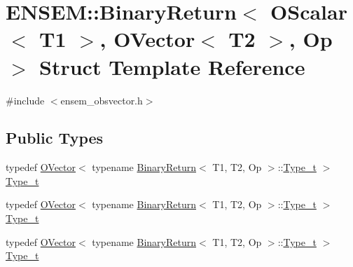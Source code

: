 \hypertarget{structENSEM_1_1BinaryReturn_3_01OScalar_3_01T1_01_4_00_01OVector_3_01T2_01_4_00_01Op_01_4}{}\section{E\+N\+S\+EM\+:\+:Binary\+Return$<$ O\+Scalar$<$ T1 $>$, O\+Vector$<$ T2 $>$, Op $>$ Struct Template Reference}
\label{structENSEM_1_1BinaryReturn_3_01OScalar_3_01T1_01_4_00_01OVector_3_01T2_01_4_00_01Op_01_4}


{\ttfamily \#include $<$ensem\+\_\+obsvector.\+h$>$}

\subsection*{Public Types}
\begin{DoxyCompactItemize}
\item 
typedef \mbox{\hyperlink{classENSEM_1_1OVector}{O\+Vector}}$<$ typename \mbox{\hyperlink{structENSEM_1_1BinaryReturn}{Binary\+Return}}$<$ T1, T2, Op $>$\+::\mbox{\hyperlink{structENSEM_1_1BinaryReturn_3_01OScalar_3_01T1_01_4_00_01OVector_3_01T2_01_4_00_01Op_01_4_ab27873926cc30b187ec230fa31f23dae}{Type\+\_\+t}} $>$ \mbox{\hyperlink{structENSEM_1_1BinaryReturn_3_01OScalar_3_01T1_01_4_00_01OVector_3_01T2_01_4_00_01Op_01_4_ab27873926cc30b187ec230fa31f23dae}{Type\+\_\+t}}
\item 
typedef \mbox{\hyperlink{classENSEM_1_1OVector}{O\+Vector}}$<$ typename \mbox{\hyperlink{structENSEM_1_1BinaryReturn}{Binary\+Return}}$<$ T1, T2, Op $>$\+::\mbox{\hyperlink{structENSEM_1_1BinaryReturn_3_01OScalar_3_01T1_01_4_00_01OVector_3_01T2_01_4_00_01Op_01_4_ab27873926cc30b187ec230fa31f23dae}{Type\+\_\+t}} $>$ \mbox{\hyperlink{structENSEM_1_1BinaryReturn_3_01OScalar_3_01T1_01_4_00_01OVector_3_01T2_01_4_00_01Op_01_4_ab27873926cc30b187ec230fa31f23dae}{Type\+\_\+t}}
\item 
typedef \mbox{\hyperlink{classENSEM_1_1OVector}{O\+Vector}}$<$ typename \mbox{\hyperlink{structENSEM_1_1BinaryReturn}{Binary\+Return}}$<$ T1, T2, Op $>$\+::\mbox{\hyperlink{structENSEM_1_1BinaryReturn_3_01OScalar_3_01T1_01_4_00_01OVector_3_01T2_01_4_00_01Op_01_4_ab27873926cc30b187ec230fa31f23dae}{Type\+\_\+t}} $>$ \mbox{\hyperlink{structENSEM_1_1BinaryReturn_3_01OScalar_3_01T1_01_4_00_01OVector_3_01T2_01_4_00_01Op_01_4_ab27873926cc30b187ec230fa31f23dae}{Type\+\_\+t}}
\end{DoxyCompactItemize}



